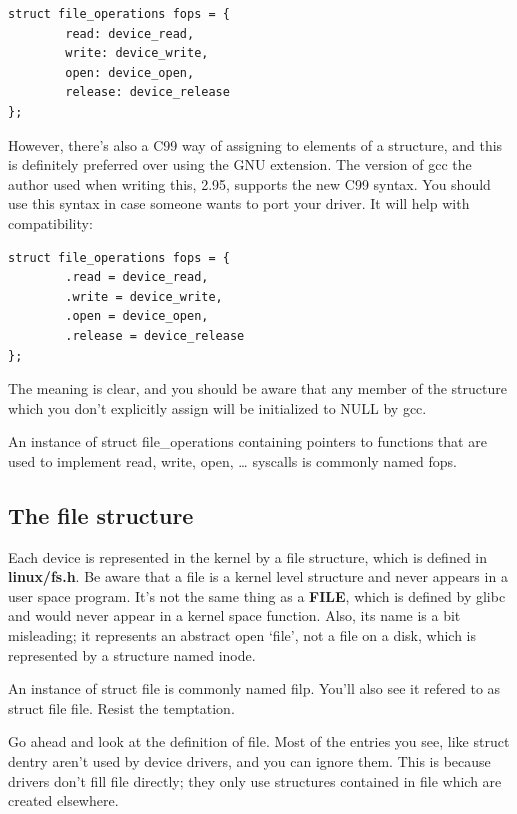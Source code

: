 \documentclass[11pt]{article}
\begin{document}
\begin{verbatim}
struct file_operations fops = {
        read: device_read,
        write: device_write,
        open: device_open,
        release: device_release
};
\end{verbatim}

However, there's also a C99 way of assigning to elements of a structure, and this is definitely preferred over using the GNU extension. The version of gcc the author used when writing this, 2.95, supports the new C99 syntax. You should use this syntax in case someone wants to port your driver. It will help with compatibility:

\begin{verbatim}
struct file_operations fops = {
        .read = device_read,
        .write = device_write,
        .open = device_open,
        .release = device_release
};
\end{verbatim}

The meaning is clear, and you should be aware that any member of the structure which you don't explicitly assign will be initialized to NULL by gcc.

An instance of struct file\_operations containing pointers to functions that are used to implement read, write, open, \ldots{} syscalls is commonly named fops.

\subsection*{The file structure}
\label{sec-6-2}

Each device is represented in the kernel by a file structure, which is defined in \textbf{linux/fs.h}. Be aware that a file is a kernel level structure and never appears in a user space program. It's not the same thing as a \textbf{FILE}, which is defined by glibc and would never appear in a kernel space function. Also, its name is a bit misleading; it represents an abstract open `file', not a file on a disk, which is represented by a structure named inode.

An instance of struct file is commonly named filp. You'll also see it refered to as struct file file. Resist the temptation.

Go ahead and look at the definition of file. Most of the entries you see, like struct dentry aren't used by device drivers, and you can ignore them. This is because drivers don't fill file directly; they only use structures contained in file which are created elsewhere.
\end{document}
